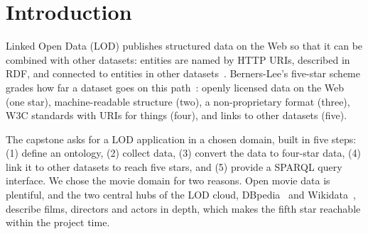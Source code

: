 \documentclass[11pt,a4paper]{article}
\newcommand{\code}[1]{\texttt{#1}}
\begin{document}
\begin{abstract}
\noindent
This report presents a Linked Open Data application in the movie domain that reaches all five stars of the deployment scheme proposed by Berners-Lee. We designed a small OWL ontology that reuses schema.org, FOAF, the DBpedia ontology and Dublin Core, collected the 250 best-rated films of the TMDB 5000 dataset, converted them to RDF with stable URIs, and linked films and people to Wikidata and DBpedia. Linking matches on the TMDB identifiers that Wikidata already stores instead of on titles, which produced 920 \code{owl:sameAs} links to Wikidata and 912 to DBpedia. A manual evaluation on a random sample of 30 resources measured a precision of 100\% for Wikidata and 96.7\% for DBpedia; the single error revealed that DBpedia redirect resources carry stale \code{owl:sameAs} statements, which we then excluded. Defined classes and one SWRL rule allow the HermiT reasoner to infer 29 action films, 16 comedies, 32 award-winning directors and 5 actor-directors, and a deliberately contradictory record is detected as an inconsistency. The resulting graph of 12,013 triples is queried with 21 SPARQL queries, ten of which are federated queries that retrieve facts from Wikidata and DBpedia at query time.

\medskip\noindent\textbf{Keywords:} Linked Open Data, ontology engineering, OWL, SWRL, entity linking, SPARQL federation.
\end{abstract}

\tableofcontents
\newpage

\section{Introduction}

Linked Open Data (LOD) publishes structured data on the Web so that it can be combined with other datasets: entities are named by HTTP URIs, described in RDF, and connected to entities in other datasets~\cite{bizer2009linked}. Berners-Lee's five-star scheme grades how far a dataset goes on this path~\cite{fivestar}: openly licensed data on the Web (one star), machine-readable structure (two), a non-proprietary format (three), W3C standards with URIs for things (four), and links to other datasets (five).

The capstone asks for a LOD application in a chosen domain, built in five steps: (1) define an ontology, (2) collect data, (3) convert the data to four-star data, (4) link it to other datasets to reach five stars, and (5) provide a SPARQL query interface. We chose the movie domain for two reasons. Open movie data is plentiful, and the two central hubs of the LOD cloud, DBpedia~\cite{dbpedia} and Wikidata~\cite{wikidata}, describe films, directors and actors in depth, which makes the fifth star reachable within the project time.
\end{document}
